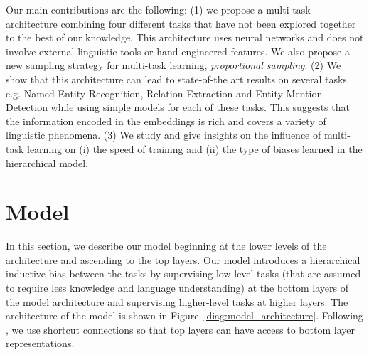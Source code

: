 \documentclass[letterpaper]{article} %
\begin{document}
Our main contributions are the following:
(1) we propose a multi-task architecture combining four different tasks that have not been explored together to the best of our knowledge. This architecture uses neural networks and does not involve external linguistic tools or hand-engineered features. We also propose a new sampling strategy for multi-task learning, \textit{proportional sampling}.
(2) We show that this architecture can lead to state-of-the art results on several tasks e.g. Named Entity Recognition, Relation Extraction and Entity Mention Detection while using simple models for each of these tasks. This suggests that the information encoded in the embeddings is rich and covers a variety of linguistic phenomena.
(3) We study and give insights on the influence of multi-task learning on (i) the speed of training and (ii) the type of biases learned in the hierarchical model.



\section{Model}

In this section, we describe our model beginning at the lower levels of the architecture and ascending to the top layers. Our model introduces a hierarchical inductive bias between the tasks by supervising low-level tasks (that are assumed to require less knowledge and language understanding) at the bottom layers of the model architecture and supervising higher-level tasks at higher layers. The architecture of the model is shown in Figure~\ref{diag:model_architecture}. Following \cite{Hashimoto2017}, we use shortcut connections so that top layers can have access to bottom layer representations.
\end{document}
